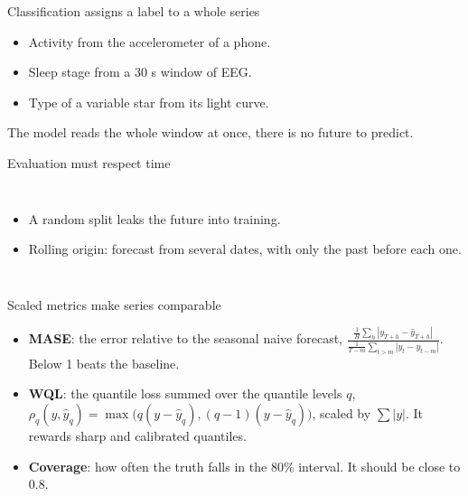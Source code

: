 \begin{frame}{Classification assigns a label to a whole series}
  \begin{itemize}
    \item Activity from the accelerometer of a phone.
    \item Sleep stage from a 30 s window of EEG.
    \item Type of a variable star from its light curve.
  \end{itemize}
  \vskip2mm
  The model reads the whole window at once, there is no future to predict.
\end{frame}

\begin{frame}{Evaluation must respect time}
  \begin{columns}[c]
    \begin{itemize}
      \item A random split leaks the future into training.
      \item Rolling origin: forecast from several dates, with only the past
        before each one.
    \end{itemize}
  \end{columns}
\end{frame}

\begin{frame}{Scaled metrics make series comparable}
  \begin{itemize}
    \item \textbf{MASE}: the error relative to the seasonal naive forecast,
      $\displaystyle \frac{\frac1H\sum_h |y_{T+h}-\hat y_{T+h}|}{\frac1{T-m}\sum_{t>m} |y_t - y_{t-m}|}$.
      Below 1 beats the baseline.
    \item \textbf{WQL}: the quantile loss summed over the quantile levels $q$,
      $\rho_q(y, \hat y_q) = \max\big(q(y-\hat y_q), (q-1)(y-\hat y_q)\big)$,
      scaled by $\sum |y|$. It rewards sharp and calibrated quantiles.
    \item \textbf{Coverage}: how often the truth falls in the 80\% interval.
      It should be close to 0.8.
  \end{itemize}
\end{frame}

